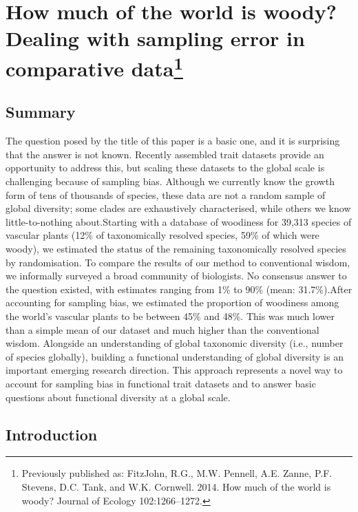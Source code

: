 \chapter[How much of the world is woody? Dealing with sampling error in comparative data]{How much of the world is woody? Dealing with sampling error in comparative data\footnote {Previously published as: FitzJohn, R.G., M.W. Pennell, A.E. Zanne, P.F. Stevens, D.C. Tank, and
  W.K. Cornwell. 2014. How much of the world is woody? 
  Journal of Ecology 102:1266--1272.}}
\label{chap:wood}

\section{Summary}
The question posed by the title of this paper is a basic one,
  and it is surprising that the answer is not known. Recently
  assembled trait datasets provide an opportunity to address this, but
  scaling these datasets to the global scale is challenging because of
  sampling bias.  Although we currently know the growth form of tens
  of thousands of species, these data are not a random sample of
  global diversity; some clades are exhaustively characterised, while
  others we know little-to-nothing about.Starting with a database of woodiness for 39,313 species of
  vascular plants (12\% of taxonomically resolved species, 59\% of
  which were woody), we estimated the status of the remaining
  taxonomically resolved species by randomisation.  To compare the
  results of our method to conventional wisdom, we informally surveyed
  a broad community of biologists.  No consensus answer to the
  question existed, with estimates ranging from 1\% to 90\% (mean:
  31.7\%).After accounting for sampling bias, we estimated the proportion
  of woodiness among the world's vascular plants to be between 45\%
  and 48\%.  This was much lower than a simple mean of our dataset and
  much higher than the conventional wisdom. Alongside an understanding of global taxonomic
  diversity (i.e., number of species globally), building a functional
  understanding of global diversity is an important emerging research
  direction.  This approach represents a novel way to account for
  sampling bias in functional trait datasets and to answer basic
  questions about functional diversity at a global scale.

\section{Introduction}

